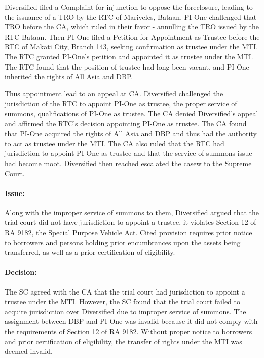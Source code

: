 \documentclass[
12pt,
oneside,
onehalfspacing,
headsepline
]{DigestCollection}
\begin{document}
Diversified filed a Complaint for injunction to oppose the foreclosure, leading to the issuance of a TRO by the RTC of Mariveles, Bataan. PI-One challenged that TRO before the CA, which ruled in their favor - annulling the TRO issued by the RTC Bataan. Then PI-One filed a Petition for Appointment as Trustee before the RTC of Makati City, Branch 143, seeking confirmation as trustee under the MTI. The RTC granted PI-One's petition and appointed it as trustee under the MTI. The RTC found that the position of trustee had long been vacant, and PI-One inherited the rights of All Asia and DBP.

Thus appointment lead to an appeal at CA. Diversified challenged the jurisdiction of the RTC to appoint PI-One as trustee, the proper service of summons, qualifications of PI-One as trustee. The CA denied Diversified's appeal and affirmed the RTC's decision appointing PI-One as trustee. The CA found that PI-One acquired the rights of All Asia and DBP and thus had the authority to act as trustee under the MTI. The CA also ruled that the RTC had jurisdiction to appoint PI-One as trustee and that the service of summons issue had become moot. Diversified then reached escalated the casew to the Supreme Court.

\paragraph{Issue:}
\label{9da496c0-09fd-11ef-932c-63c852f65e48}


Along with the improper service of summons to them, Diversified argued that the trial court did not have jurisdiction to appoint a trustee, it violates Section 12 of RA 9182, the Special Purpose Vehicle Act. Cited provision requires prior notice to borrowers and persons holding prior encumbrances upon the assets being transferred, as well as a prior certification of eligibility.

\paragraph{Decision:}
\label{9f7e38c0-09fd-11ef-932c-63c852f65e48}


The SC agreed with the CA that the trial court had jurisdiction to appoint a trustee under the MTI. However, the SC found that the trial court failed to acquire jurisdiction over Diversified due to improper service of summons. The assignment between DBP and PI-One was invalid because it did not comply with the requirements of Section 12 of RA 9182. Without proper notice to borrowers and prior certification of eligibility, the transfer of rights under the MTI was deemed invalid.
\end{document}
